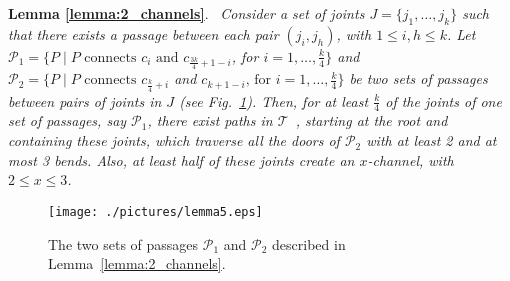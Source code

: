 \documentclass[a4paper,10pt]{llncs}
\newcommand{\rephrase}[3]{\noindent\textbf{#1 #2}.~\emph{#3}}
\newcommand{\T}{\mbox{$\mathcal T$ }}
\begin{document}
\rephrase{Lemma}{\ref{lemma:2_channels}}{
Consider a set of joints $J= \{j_1,\ldots ,j_k\}$ such that there exists a passage between each pair $(j_i,j_h)$, with $1 \leq i,h \leq k$. Let ${\mathcal P}_1 =\{P \mid P\textrm{ connects } c_i \textrm{ and } c_{\frac{3k}{4}+1-i}$, for $i=1,\dots, \frac{k}{4} \}$ and ${\mathcal P}_2 =\{P \mid P\textrm{ connects } c_{\frac{k}{4}+i} $ and $c_{k+1-i}  \textrm{, for } i=1,\dots, \frac{k}{4} \}$ be two sets of passages between pairs of joints in $J$ (see Fig.~\ref{fig:lemma5}). Then, for at least $\frac{k}{4}$ of the joints of one set of passages, say ${\mathcal P}_1$, there exist paths in \T, starting at the root and containing these joints, which traverse all the doors of ${\mathcal P}_2$ with at least 2 and at most 3 bends. Also, at least half of these joints create an $x$-channel, with $2\leq x \leq 3$.
}

\begin{figure}[ht]
\begin{center}
\texttt{[image: ./pictures/lemma5.eps]}
\caption{The two sets of passages ${\mathcal P}_1$ and ${\mathcal P}_2$ described in Lemma~\ref{lemma:2_channels}.}
\label{fig:lemma5}
\end{center}
\end{figure}
\end{document}
